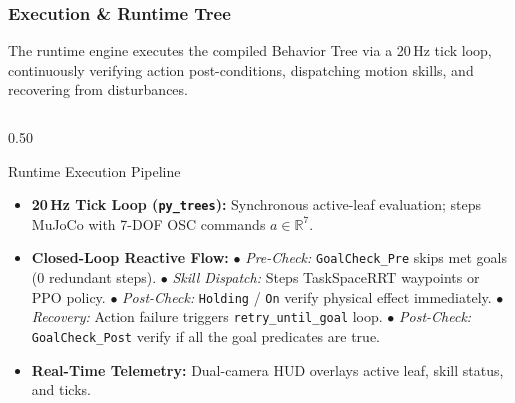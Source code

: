\documentclass[10pt]{beamer}
\begin{document}
\begin{frame}[fragile,t]
\frametitle{Execution \& Runtime Tree}
\vspace{-0.25cm}
\footnotesize
The runtime engine executes the compiled Behavior Tree via a 20\,Hz tick loop, continuously verifying action post-conditions, dispatching motion skills, and recovering from disturbances.

\vspace{-0.22cm}
\begin{columns}[T]
    \begin{column}{0.50\textwidth}
        \begin{block}{Runtime Execution Pipeline}
            \begin{itemize}\scriptsize
                \setlength\itemsep{0.05em}
                \item \textbf{20\,Hz Tick Loop (\texttt{py\_trees}):}
                Synchronous active-leaf evaluation; steps MuJoCo with 7-DOF OSC commands $a \in \mathbb{R}^7$.
                \item \textbf{Closed-Loop Reactive Flow:}
                \newline $\bullet$ \textit{Pre-Check:} \texttt{GoalCheck\_Pre} skips met goals ($0$ redundant steps).
                \newline $\bullet$ \textit{Skill Dispatch:} Steps TaskSpaceRRT waypoints or PPO policy.
                \newline $\bullet$ \textit{Post-Check:} \texttt{Holding} / \texttt{On} verify physical effect immediately.
                \newline $\bullet$ \textit{Recovery:} Action failure triggers \texttt{retry\_until\_goal} loop.
                \newline $\bullet$ \textit{Post-Check:} \texttt{GoalCheck\_Post} verify if all the goal predicates are true.
                \item \textbf{Real-Time Telemetry:}
                Dual-camera HUD overlays active leaf, skill status, and ticks.
            \end{itemize}
        \end{block}
    \end{column}


\end{columns}
\end{frame}
\end{document}

